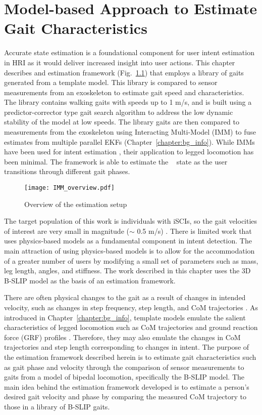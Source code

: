 \chapter{Model-based Approach to Estimate Gait Characteristics} \label{chapter:IMM}
Accurate state estimation is a foundational component for user intent estimation in HRI as it would deliver increased insight into user actions. This chapter describes and estimation framework (Fig.~\ref{fig:IMM_overview}) that employs a library of gaits generated from a template model. This library is compared to sensor measurements from an exoskeleton to estimate gait speed and characteristics. The library contains walking gaits with speeds up to 1 m/s, and is built using a predictor-corrector type gait search algorithm to address the low dynamic stability of the model at low speeds. The library gaits are then compared to measurements from the exoskeleton using Interacting Multi-Model (IMM) to fuse estimates from multiple parallel EKFs (Chapter~\ref{chapter:bg_info}). While IMMs have been used for intent estimation \cite{chaandar2015human}, their application to legged locomotion has been minimal. The framework is able to estimate the \com~ state as the user transitions through different gait phases.

\begin{figure}
	\centering
	\texttt{[image: IMM\_overview.pdf]}
	\caption{Overview of the estimation setup}\label{fig:IMM_overview}
	\vspace{-1em}
\end{figure}

The target population of this work is individuals with iSCIs, so the gait velocities of interest are very small in magnitude ($ \sim $ 0.5 m/s) \cite{nymark2005electromyographic}. There is limited work that uses physics-based models as a fundamental component in intent detection. The main attraction of using physics-based models is to allow for the accommodation of a greater number of users by modifying a small set of parameters such as mass, leg length, angles, and stiffness. The work described in this chapter uses the 3D B-SLIP model \cite{liu2015dynamic} as the basis of an estimation framework.

There are often physical changes to the gait as a result of changes in intended velocity, such as changes in step frequency, step length, and CoM trajectories \cite{kuo2001simple}. As introduced in Chapter~\ref{chapter:bg_info}, template models emulate the salient characteristics of legged locomotion such as CoM trajectories and ground reaction force (GRF) profiles \cite{mochon1980ballistic}. Therefore, they may also emulate the changes in CoM trajectories and step length corresponding to changes in intent. The purpose of the estimation framework described herein is to estimate gait characteristics such as gait phase and velocity through the comparison of sensor measurements to gaits from a model of bipedal locomotion, specifically the B-SLIP model. The main idea behind the estimation framework developed is to estimate a person's desired gait velocity and phase by comparing the measured CoM trajectory to those in a library of B-SLIP gaits. 

